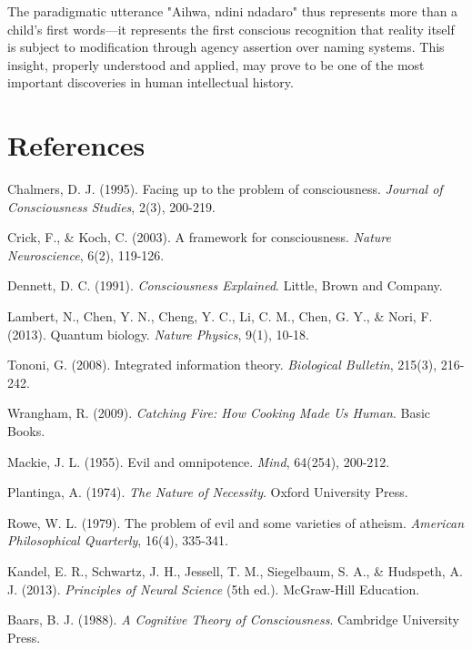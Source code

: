 \documentclass[12pt]{article}
\begin{document}
The paradigmatic utterance "Aihwa, ndini ndadaro" thus represents more than a child's first words—it represents the first conscious recognition that reality itself is subject to modification through agency assertion over naming systems. This insight, properly understood and applied, may prove to be one of the most important discoveries in human intellectual history.

\section{References}

\begin{thebibliography}{99}

 Chalmers, D. J. (1995). Facing up to the problem of consciousness. \textit{Journal of Consciousness Studies}, 2(3), 200-219.

 Crick, F., \& Koch, C. (2003). A framework for consciousness. \textit{Nature Neuroscience}, 6(2), 119-126.

 Dennett, D. C. (1991). \textit{Consciousness Explained}. Little, Brown and Company.

 Lambert, N., Chen, Y. N., Cheng, Y. C., Li, C. M., Chen, G. Y., \& Nori, F. (2013). Quantum biology. \textit{Nature Physics}, 9(1), 10-18.

 Tononi, G. (2008). Integrated information theory. \textit{Biological Bulletin}, 215(3), 216-242.

 Wrangham, R. (2009). \textit{Catching Fire: How Cooking Made Us Human}. Basic Books.

 Mackie, J. L. (1955). Evil and omnipotence. \textit{Mind}, 64(254), 200-212.

 Plantinga, A. (1974). \textit{The Nature of Necessity}. Oxford University Press.

 Rowe, W. L. (1979). The problem of evil and some varieties of atheism. \textit{American Philosophical Quarterly}, 16(4), 335-341.

 Kandel, E. R., Schwartz, J. H., Jessell, T. M., Siegelbaum, S. A., \& Hudspeth, A. J. (2013). \textit{Principles of Neural Science} (5th ed.). McGraw-Hill Education.

 Baars, B. J. (1988). \textit{A Cognitive Theory of Consciousness}. Cambridge University Press.


\end{thebibliography}
\end{document}
